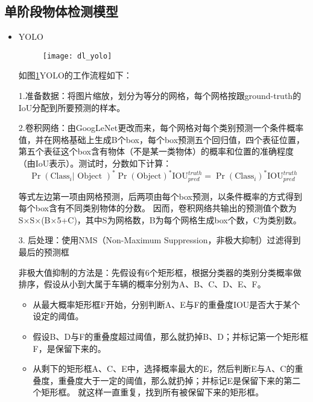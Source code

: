 \subsection{单阶段物体检测模型}
\begin{itemize}
	\item YOLO\cite{32redmon2016you}
	\begin{figure}[!htbp]
    \centering
    \texttt{[image: dl\_yolo]}
    \label{fig:dl_yolo}
	\end{figure}
	如图\ref{fig:dl_yolo}YOLO的工作流程如下：
	
1.准备数据：将图片缩放，划分为等分的网格，每个网格按跟ground-truth的IoU分配到所要预测的样本。

2.卷积网络：由GoogLeNet\cite{szegedy2015going}更改而来，每个网格对每个类别预测一个条件概率值，并在网格基础上生成B个box，每个box预测五个回归值，四个表征位置，第五个表征这个box含有物体（不是某一类物体）的概率和位置的准确程度（由IoU表示）。测试时，分数如下计算：
\begin{equation}
	\operatorname{Pr}\left(\text {Class}_{i} | \text { Object }\right)^{*} \operatorname{Pr}(\text {Object})^{*} \text{IOU}_{pred}^{truth}=\operatorname{Pr}\left(\text {Class}_{i}\right)^{*} \text{IOU}_{pred}^{truth}
\end{equation}

等式左边第一项由网格预测，后两项由每个box预测，以条件概率的方式得到每个box含有不同类别物体的分数。 因而，卷积网络共输出的预测值个数为S×S×(B×5+C)，其中S为网格数，B为每个网格生成box个数，C为类别数。

3. 后处理：使用NMS（Non-Maximum Suppression，非极大抑制）\cite{hosang2017learning}过滤得到最后的预测框

非极大值抑制的方法是：先假设有6个矩形框，根据分类器的类别分类概率做排序，假设从小到大属于车辆的概率分别为A、B、C、D、E、F。
\begin{itemize}
	\item 从最大概率矩形框F开始，分别判断A、E与F的重叠度IOU是否大于某个设定的阈值。
	\item 假设B、D与F的重叠度超过阈值，那么就扔掉B、D；并标记第一个矩形框F，是保留下来的。
	\item 从剩下的矩形框A、C、E中，选择概率最大的E，然后判断E与A、C的重叠度，重叠度大于一定的阈值，那么就扔掉；并标记E是保留下来的第二个矩形框。
	就这样一直重复，找到所有被保留下来的矩形框。
\end{itemize}



\end{itemize}
